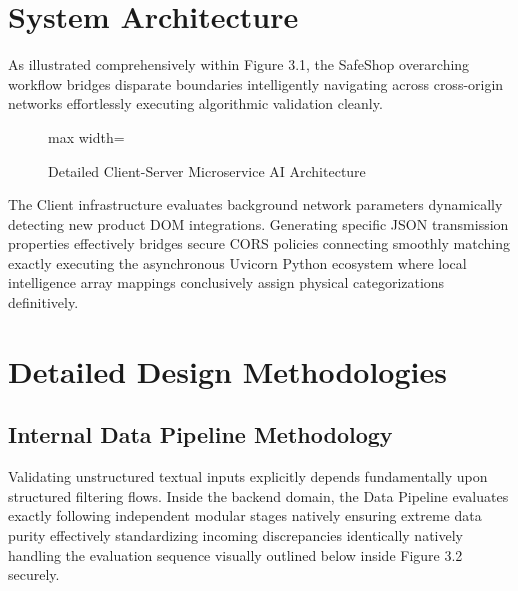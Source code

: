 \documentclass[12pt,a4paper]{report}
\begin{document}
\section{System Architecture}

As illustrated comprehensively within Figure 3.1, the SafeShop overarching workflow bridges disparate boundaries intelligently navigating across cross-origin networks effortlessly executing algorithmic validation cleanly.

\begin{figure}[htbp]
    \centering
    \begin{adjustbox}{max width=\textwidth}
    \end{adjustbox}
    \caption{Detailed Client-Server Microservice AI Architecture}
\end{figure}

The Client infrastructure evaluates background network parameters dynamically detecting new product DOM integrations. Generating specific JSON transmission properties effectively bridges secure CORS policies connecting smoothly matching exactly executing the asynchronous Uvicorn Python ecosystem where local intelligence array mappings conclusively assign physical categorizations definitively.

\section{Detailed Design Methodologies}

\subsection{Internal Data Pipeline Methodology}
Validating unstructured textual inputs explicitly depends fundamentally upon structured filtering flows. Inside the backend domain, the Data Pipeline evaluates exactly following independent modular stages natively ensuring extreme data purity effectively standardizing incoming discrepancies identically natively handling the evaluation sequence visually outlined below inside Figure 3.2 securely.
\end{document}
